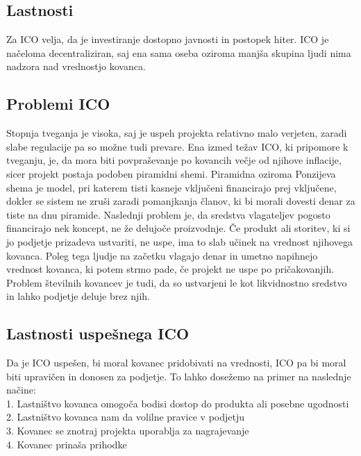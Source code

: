\documentclass[letterpaper, titlepage, freqn]{article}
\begin{document}
\subsection{Lastnosti}

Za ICO velja, da je investiranje dostopno javnosti in postopek hiter.  ICO je načeloma decentraliziran, saj ena sama oseba oziroma manjša skupina ljudi nima nadzora nad vrednostjo kovanca.\\

\subsection{Problemi ICO}

Stopnja tveganja je visoka, saj je uspeh projekta relativno malo verjeten, zaradi slabe regulacije pa so možne tudi prevare. Ena izmed težav ICO, ki pripomore k tveganju, je, da mora biti povpraševanje po kovancih večje od njihove inflacije, sicer projekt postaja podoben piramidni shemi. Piramidna oziroma Ponzijeva shema je model, pri katerem tisti kasneje vključeni financirajo prej vključene, dokler se sistem ne zruši zaradi pomanjkanja članov, ki bi morali dovesti denar za tiste na dnu piramide. Naslednji problem je, da sredstva vlagateljev pogosto financirajo nek koncept, ne že delujoče proizvodnje. Če produkt ali storitev, ki si jo podjetje prizadeva ustvariti, ne uspe, ima to slab učinek na vrednost njihovega kovanca. Poleg tega ljudje na začetku vlagajo denar in umetno napihnejo vrednost kovanca, ki potem strmo pade, če projekt ne uspe po pričakovanjih. Problem številnih kovancev je tudi, da so ustvarjeni le kot likvidnostno sredstvo in lahko podjetje deluje brez njih.\\

\subsection{Lastnosti uspešnega ICO}

Da je ICO uspešen, bi moral kovanec pridobivati na vrednosti, ICO pa bi moral biti upravičen in donosen za podjetje. To lahko dosežemo na primer na naslednje načine:\\
1. Lastništvo kovanca omogoča bodisi dostop do produkta ali posebne ugodnosti\\
2. Lastništvo kovanca nam da volilne pravice v podjetju\\
3. Kovanec se znotraj projekta uporablja za nagrajevanje\\
4. Kovanec prinaša prihodke\\
\end{document}
